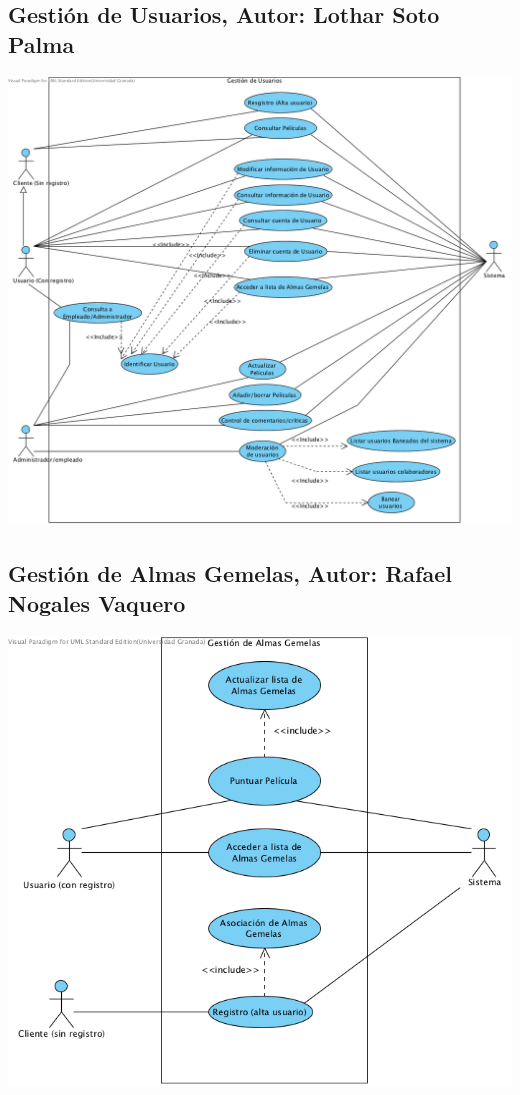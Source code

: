 \documentclass{article}
\begin{document}
\subsection*{Gestión de Usuarios, Autor: Lothar Soto Palma}
		\begin{center}
   			\includegraphics[scale=0.65]{GestiondeUsuarios.png}
   		\end{center}	
   		\pagebreak
\subsection*{Gestión de Almas Gemelas, Autor: Rafael Nogales Vaquero}
		\begin{center}
   			\includegraphics[scale=0.65]{GestiondeAlmasGemelas.png}
   		\end{center}	
   		\pagebreak
\end{document}
